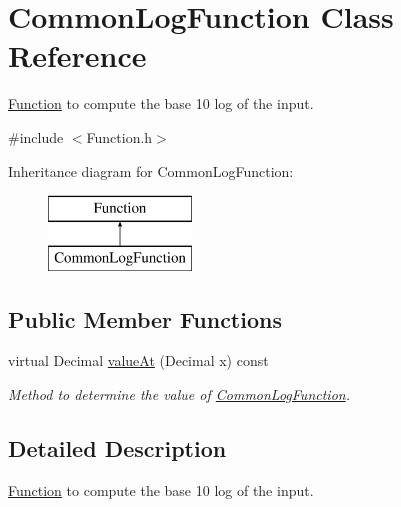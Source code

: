 \hypertarget{class_common_log_function}{\section{Common\+Log\+Function Class Reference}
\label{class_common_log_function}
}


\hyperlink{class_function}{Function} to compute the base 10 log of the input.  




{\ttfamily \#include $<$Function.\+h$>$}

Inheritance diagram for Common\+Log\+Function\+:\begin{figure}[H]
\begin{center}
\leavevmode
\includegraphics[height=2.000000cm]{class_common_log_function}
\end{center}
\end{figure}
\subsection*{Public Member Functions}
\begin{DoxyCompactItemize}
\item 
virtual Decimal \hyperlink{class_common_log_function_a96f716f78cdab4c5458f8372424b52a4}{value\+At} (Decimal x) const 
\begin{DoxyCompactList}\small\item\em Method to determine the value of \hyperlink{class_common_log_function}{Common\+Log\+Function}. \end{DoxyCompactList}\end{DoxyCompactItemize}


\subsection{Detailed Description}
\hyperlink{class_function}{Function} to compute the base 10 log of the input. 

